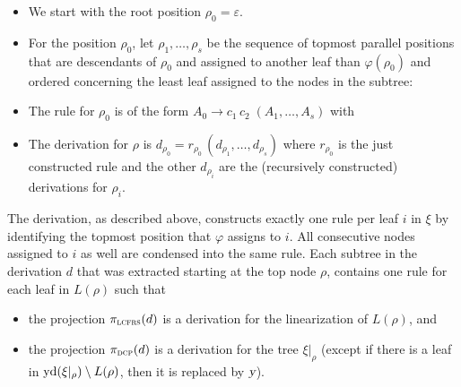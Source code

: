 \documentclass[../../document.tex]{subfiles}
\begin{document}
    \begin{itemize}
        \item We start with the root position \(\rho_0 = \varepsilon\).
        \item For the position \(\rho_0\), let \(\rho_1, \ldots, \rho_s\) be the sequence of topmost parallel positions that are descendants of \(\rho_0\) and assigned to another leaf than \(\varphi(\rho_0)\) and ordered concerning the least leaf assigned to the nodes in the subtree:
        \item The rule for \(\rho_0\) is of the form \(A_0 \to c_1 \, c_2\; (A_1, \ldots, A_s)\) with
        \item The derivation for \(\rho\) is \(d_{\rho_0} = r_{\rho_0}\,(d_{\rho_1}, \ldots, d_{\rho_s})\) where \(r_{\rho_0}\) is the just constructed rule and the other \(d_{\rho_i}\) are the (recursively constructed) derivations for \(\rho_i\).
    \end{itemize}

    The derivation, as described above, constructs exactly one rule per leaf \(i\) in \(\xi\) by identifying the topmost position that \(\varphi\) assigns to \(i\).
    All consecutive nodes assigned to \(i\) as well are condensed into the same rule.
    Each subtree in the derivation \(d\) that was extracted starting at the top node \(\rho\), contains one rule for each leaf in \(L(\rho)\) such that
    \begin{itemize}
        \item the  projection \(\pi_{\textsc{lcfrs}}(d)\) is a derivation for the linearization of \(L(\rho)\), and
        \item the  projection \(\pi_{\textsc{dcp}}(d)\) is a derivation for the tree \(\xi|_\rho\) (except if there is a leaf in \(\operatorname{yd}(\xi|_\rho) \setminus L(\rho)\), then it is replaced by \(\textsl{y}\)).
    \end{itemize}
\end{document}
